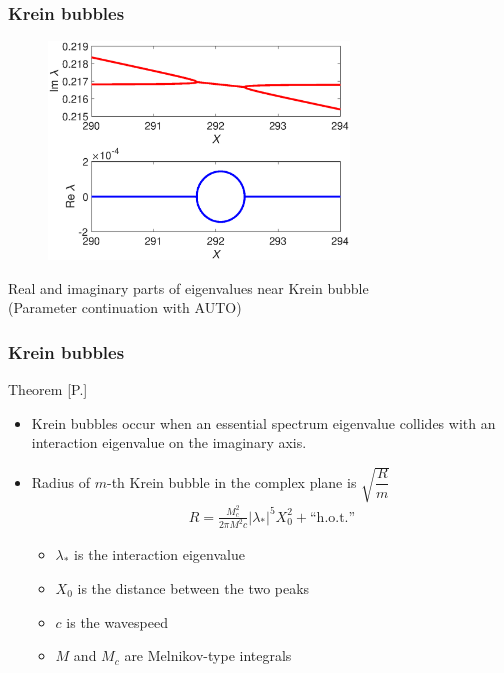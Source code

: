 \documentclass[16pt]{beamer}
\begin{document}
\begin{frame}
	\frametitle{Krein bubbles}
		\begin{figure}
		\begin{center}
		\includegraphics[width=8cm]{images/Kreinbubble1.eps}
		\end{center}
		\end{figure}
		\begin{center}
		Real and imaginary parts of eigenvalues near Krein bubble \\
		(Parameter continuation with AUTO)
		\end{center}
\end{frame}

\begin{frame}
	\frametitle{Krein bubbles}
	\begin{block}{Theorem [P.]}

		\begin{itemize}
		\item Krein bubbles occur when an essential spectrum eigenvalue collides with an interaction eigenvalue on the imaginary axis.

		\item Radius of $m$-th Krein bubble in the complex plane is $\sqrt{\dfrac{R}{m}}$
		\begin{align*}
		R = \frac{M_c^2 }{2 \pi M^2 c } |\lambda_*|^5 X_0^2 + \text{``h.o.t.''}
		\end{align*}
		\begin{itemize}
			\item $\lambda_*$ is the interaction eigenvalue
			\item $X_0$ is the distance between the two peaks
			\item $c$ is the wavespeed
			\item $M$ and $M_c$ are Melnikov-type integrals
		\end{itemize}
		\end{itemize}
	\end{block}
\end{frame}
\end{document}
